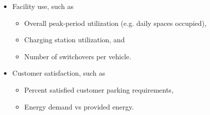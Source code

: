 \documentclass[11pt]{tubsartcl}
\begin{document}
\begin{itemize}
\item Facility use, such as
\begin{itemize}
 \item Overall peak-period utilization (e.g. daily spaces occupied),
 \item Charging station utilization, and
 \item Number of switchovers per vehicle.
\end{itemize}
\item Customer satisfaction, such as
\begin{itemize}
 \item Percent satisfied customer parking requirements,
 \item Energy demand vs provided energy.
\end{itemize}
\end{itemize}
\end{document}

